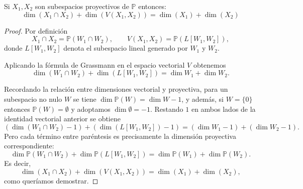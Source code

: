 
\begin{proposición}
    Si $X_1, X_2$ son subespacios proyectivos de $\mathbb{P}$ entonces:
    \[
    \dim(X_1 \cap X_2) + \dim(V(X_1, X_2)) = \dim(X_1) + \dim(X_2)
    \]
\end{proposición}

\begin{proof}
    Por definición
    \[
    X_1\cap X_2=\mathbb{P}(W_1\cap W_2),\qquad V(X_1,X_2)=\mathbb{P}(L[W_1,W_2]),
    \]
    donde \(L[W_1,W_2]\) denota el subespacio lineal generado por \(W_1\) y \(W_2\).
    
    Aplicando la fórmula de Grassmann en el espacio vectorial \(V\) obtenemos
    \[
    \dim(W_1\cap W_2)+\dim(L[W_1,W_2])=\dim W_1+\dim W_2.
    \]
    
    Recordando la relación entre dimensiones vectorial y proyectiva, para un subespacio no nulo \(W\) se tiene
    \(\dim\mathbb{P}(W)=\dim W-1\), y además, si \(W=\{0\}\) entonces \(\mathbb{P}(W)=\emptyset\) y adoptamos \(\dim\emptyset=-1\). Restando \(1\) en ambos lados de la identidad vectorial anterior se obtiene
    \[
    (\dim(W_1\cap W_2)-1)+(\dim(L[W_1,W_2])-1)=(\dim W_1-1)+(\dim W_2-1).
    \]
    Pero cada término entre paréntesis es precisamente la dimensión proyectiva correspondiente:
    \[
    \dim\mathbb{P}(W_1\cap W_2)+\dim\mathbb{P}(L[W_1,W_2])
    =\dim\mathbb{P}(W_1)+\dim\mathbb{P}(W_2).
    \]
    Es decir,
    \[
    \dim(X_1\cap X_2)+\dim(V(X_1,X_2))=\dim(X_1)+\dim(X_2),
    \]
    como queríamos demostrar.
\end{proof}

